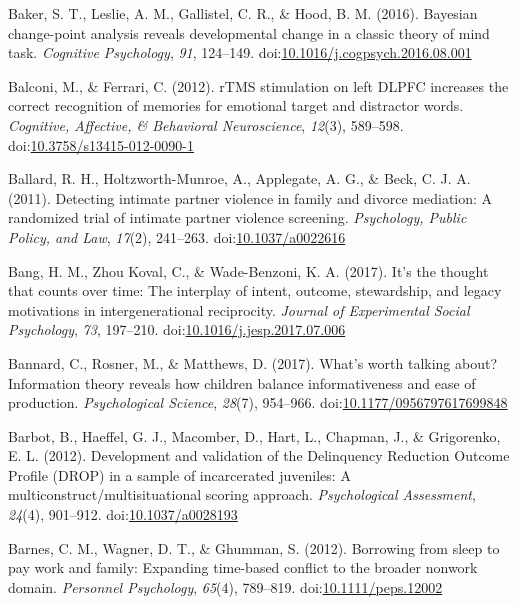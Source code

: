 \documentclass[english,man]{apa6}
\theoremstyle{definition}
\theoremstyle{definition}
\theoremstyle{definition}
\theoremstyle{remark}
\begin{document}
\hypertarget{ref-Baker2016}{}
Baker, S. T., Leslie, A. M., Gallistel, C. R., \& Hood, B. M. (2016).
Bayesian change-point analysis reveals developmental change in a classic
theory of mind task. \emph{Cognitive Psychology}, \emph{91}, 124--149.
doi:\href{https://doi.org/10.1016/j.cogpsych.2016.08.001}{10.1016/j.cogpsych.2016.08.001}

\hypertarget{ref-Balconi2012}{}
Balconi, M., \& Ferrari, C. (2012). rTMS stimulation on left DLPFC
increases the correct recognition of memories for emotional target and
distractor words. \emph{Cognitive, Affective, \& Behavioral
Neuroscience}, \emph{12}(3), 589--598.
doi:\href{https://doi.org/10.3758/s13415-012-0090-1}{10.3758/s13415-012-0090-1}

\hypertarget{ref-Ballard2011}{}
Ballard, R. H., Holtzworth-Munroe, A., Applegate, A. G., \& Beck, C. J.
A. (2011). Detecting intimate partner violence in family and divorce
mediation: A randomized trial of intimate partner violence screening.
\emph{Psychology, Public Policy, and Law}, \emph{17}(2), 241--263.
doi:\href{https://doi.org/10.1037/a0022616}{10.1037/a0022616}

\hypertarget{ref-Bang2017}{}
Bang, H. M., Zhou Koval, C., \& Wade-Benzoni, K. A. (2017). It's the
thought that counts over time: The interplay of intent, outcome,
stewardship, and legacy motivations in intergenerational reciprocity.
\emph{Journal of Experimental Social Psychology}, \emph{73}, 197--210.
doi:\href{https://doi.org/10.1016/j.jesp.2017.07.006}{10.1016/j.jesp.2017.07.006}

\hypertarget{ref-Bannard2017}{}
Bannard, C., Rosner, M., \& Matthews, D. (2017). What's worth talking
about? Information theory reveals how children balance informativeness
and ease of production. \emph{Psychological Science}, \emph{28}(7),
954--966.
doi:\href{https://doi.org/10.1177/0956797617699848}{10.1177/0956797617699848}

\hypertarget{ref-Barbot2012}{}
Barbot, B., Haeffel, G. J., Macomber, D., Hart, L., Chapman, J., \&
Grigorenko, E. L. (2012). Development and validation of the Delinquency
Reduction Outcome Profile (DROP) in a sample of incarcerated juveniles:
A multiconstruct/multisituational scoring approach. \emph{Psychological
Assessment}, \emph{24}(4), 901--912.
doi:\href{https://doi.org/10.1037/a0028193}{10.1037/a0028193}

\hypertarget{ref-Barnes2012}{}
Barnes, C. M., Wagner, D. T., \& Ghumman, S. (2012). Borrowing from
sleep to pay work and family: Expanding time-based conflict to the
broader nonwork domain. \emph{Personnel Psychology}, \emph{65}(4),
789--819.
doi:\href{https://doi.org/10.1111/peps.12002}{10.1111/peps.12002}
\end{document}
